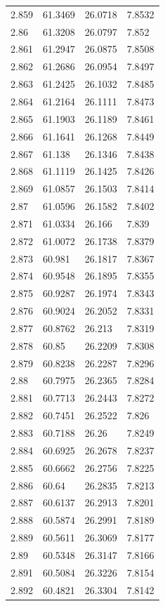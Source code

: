 \begin{tabular}{llll}
2.859 & 61.3469 & 26.0718 & 7.8532 \\
2.86 & 61.3208 & 26.0797 & 7.852 \\
2.861 & 61.2947 & 26.0875 & 7.8508 \\
2.862 & 61.2686 & 26.0954 & 7.8497 \\
2.863 & 61.2425 & 26.1032 & 7.8485 \\
2.864 & 61.2164 & 26.1111 & 7.8473 \\
2.865 & 61.1903 & 26.1189 & 7.8461 \\
2.866 & 61.1641 & 26.1268 & 7.8449 \\
2.867 & 61.138 & 26.1346 & 7.8438 \\
2.868 & 61.1119 & 26.1425 & 7.8426 \\
2.869 & 61.0857 & 26.1503 & 7.8414 \\
2.87 & 61.0596 & 26.1582 & 7.8402 \\
2.871 & 61.0334 & 26.166 & 7.839 \\
2.872 & 61.0072 & 26.1738 & 7.8379 \\
2.873 & 60.981 & 26.1817 & 7.8367 \\
2.874 & 60.9548 & 26.1895 & 7.8355 \\
2.875 & 60.9287 & 26.1974 & 7.8343 \\
2.876 & 60.9024 & 26.2052 & 7.8331 \\
2.877 & 60.8762 & 26.213 & 7.8319 \\
2.878 & 60.85 & 26.2209 & 7.8308 \\
2.879 & 60.8238 & 26.2287 & 7.8296 \\
2.88 & 60.7975 & 26.2365 & 7.8284 \\
2.881 & 60.7713 & 26.2443 & 7.8272 \\
2.882 & 60.7451 & 26.2522 & 7.826 \\
2.883 & 60.7188 & 26.26 & 7.8249 \\
2.884 & 60.6925 & 26.2678 & 7.8237 \\
2.885 & 60.6662 & 26.2756 & 7.8225 \\
2.886 & 60.64 & 26.2835 & 7.8213 \\
2.887 & 60.6137 & 26.2913 & 7.8201 \\
2.888 & 60.5874 & 26.2991 & 7.8189 \\
2.889 & 60.5611 & 26.3069 & 7.8177 \\
2.89 & 60.5348 & 26.3147 & 7.8166 \\
2.891 & 60.5084 & 26.3226 & 7.8154 \\
2.892 & 60.4821 & 26.3304 & 7.8142 \\

\end{tabular}
